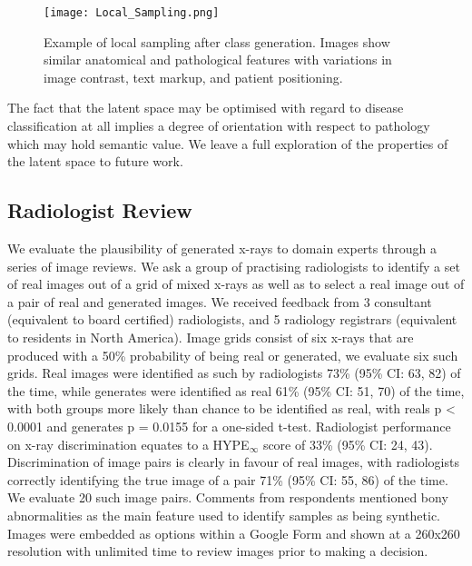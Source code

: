 \documentclass{article}
\begin{document}
\begin{figure}
    \centering
    \texttt{[image: Local\_Sampling.png]}
    \caption{Example of local sampling after class generation. Images show similar anatomical and pathological features with variations in image contrast, text markup, and patient positioning.}
    \label{fig:local}
\end{figure}

The fact that the latent space may be optimised with regard to disease classification at all implies a degree of orientation with respect to pathology which may hold semantic value. We leave a full exploration of the properties of the latent space to future work.

\subsection{Radiologist Review}
\label{sec:review}
We evaluate the plausibility of generated x-rays to domain experts through a series of image reviews. We ask a group of practising radiologists to identify a set of real images out of a grid of mixed x-rays as well as to select a real image out of a pair of real and generated images. We received feedback from 3 consultant (equivalent to board certified) radiologists, and 5 radiology registrars (equivalent to residents in North America). Image grids consist of six x-rays that are produced with a \num{50}\% probability of being real or generated, we evaluate six such grids. Real images were identified as such by radiologists \num{73}\% (95\% CI: \num{63}, \num{82}) of the time, while generates were identified as real \num{61}\% (95\% CI: \num{51}, \num{70}) of the time, with both groups more likely than chance to be identified as real, with reals p < \num{0.0001} and generates p = \num{0.0155} for a one-sided t-test. 
Radiologist performance on x-ray discrimination equates to a HYPE$_\infty$ score of \num{33}\% (95\% CI: \num{24}, \num{43}).  
Discrimination of image pairs is clearly in favour of real images, with radiologists correctly identifying the true image of a pair \num{71}\% (95\% CI: \num{55}, \num{86}) of the time. We evaluate \num{20} such image pairs. Comments from respondents mentioned bony abnormalities as the main feature used to identify samples as being synthetic. Images were embedded as options within a Google Form and shown at a 260x260 resolution with unlimited time to review images prior to making a decision. 
\end{document}
